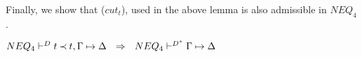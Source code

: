 \begin{PROOF}
\end{PROOF}
%
Finally, we show that ($cut_t$), used in the above lemma is also admissible in $NEQ_4$.
\begin{LEMMA}\label{le:nott} ${NEQ_4}\vdash^{{D}}t\mathbin{\prec} t,\Gamma\mathrel{\mapsto}\Delta  
\ \ \Rightarrow \ \ {NEQ_4}\vdash^{{D^*}}\Gamma\mathrel{\mapsto}\Delta$
\end{LEMMA}
